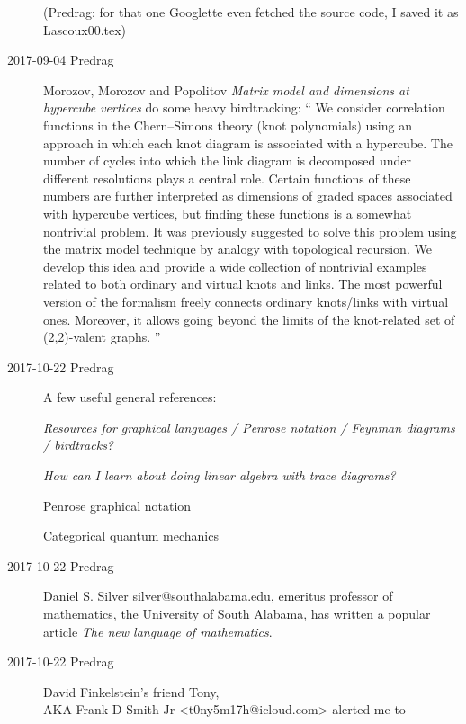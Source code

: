\begin{description}
(Predrag: for that one Googlette even fetched the source code, I saved it as
Lascoux00.tex)

\item[2017-09-04 Predrag]
Morozov, Morozov  and Popolitov
{\em Matrix model and dimensions at hypercube vertices}
do some heavy birdtracking: ``
We consider correlation functions in the Chern--Simons theory (knot
polynomials) using an approach in which each knot diagram is associated with
a hypercube. The number of cycles into which the link diagram is decomposed
under different resolutions plays a central role. Certain functions of these
numbers are further interpreted as dimensions of graded spaces associated
with hypercube vertices, but finding these functions is a somewhat nontrivial
problem. It was previously suggested to solve this problem using the matrix
model technique by analogy with topological recursion. We develop this idea
and provide a wide collection of nontrivial examples related to both ordinary
and virtual knots and links. The most powerful version of the formalism
freely connects ordinary knots/links with virtual ones. Moreover, it allows
going beyond the limits of the knot-related set of (2,2)-valent graphs.
''

\item[2017-10-22 Predrag]
A few useful general references:

{\em Resources for graphical languages / Penrose notation / Feynman diagrams /
{birdtracks?}
}

{\em How can I learn about doing linear algebra with
{trace diagrams?}
}

{Penrose graphical notation}


{Categorical quantum mechanics}

\item[2017-10-22 Predrag]
{Daniel S. Silver} silver@southalabama.edu, emeritus professor of mathematics,
the University of South Alabama, has written a popular article
{\em The new language of mathematics}.

\item[2017-10-22 Predrag] David Finkelstein's friend Tony,
\\
AKA Frank D Smith Jr <t0ny5m17h@icloud.com> alerted me to
\\


\end{description}

